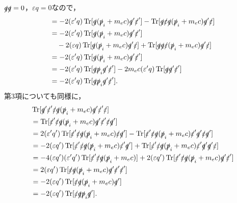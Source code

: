 $\slashed{q}\slashed{q}=0$，$\varepsilon q=0$なので，
\begin{align*}
  & = -2(\varepsilon'q)\operatorname{Tr} [\slashed{q}(\slashed{p}_i+m_ec)\slashed{q}'\slashed{\varepsilon}'] - \operatorname{Tr} [\slashed{q}\slashed{\varepsilon}\slashed{q}(\slashed{p}_i+m_ec)\slashed{q}'\slashed{\varepsilon}]\\
  & = -2(\varepsilon'q)\operatorname{Tr} [\slashed{q}(\slashed{p}_i+m_ec)\slashed{q}'\slashed{\varepsilon}'] \\
  & \quad -2(\varepsilon q)\operatorname{Tr} [\slashed{q}(\slashed{p}_i+m_ec)\slashed{q}'\slashed{\varepsilon}] + \operatorname{Tr} [\slashed{q}\slashed{q}\slashed{\varepsilon}(\slashed{p}_i+m_ec)\slashed{q}'\slashed{\varepsilon}]\\
  & = -2(\varepsilon'q)\operatorname{Tr} [\slashed{q}(\slashed{p}_i+m_ec)\slashed{q}'\slashed{\varepsilon}']\\
  & = -2(\varepsilon'q)\operatorname{Tr} [\slashed{q}\slashed{p}_i\slashed{q}'\slashed{\varepsilon}'] - 2m_ec(\varepsilon'q)\operatorname{Tr} [\slashed{q}\slashed{q}'\slashed{\varepsilon}']\\
  & = -2(\varepsilon'q)\operatorname{Tr} [\slashed{q}\slashed{p}_i\slashed{q}'\slashed{\varepsilon}'].
\end{align*}
第3項についても同様に，
\begin{align*}
  & \operatorname{Tr} [\slashed{q}'\slashed{\varepsilon}'\slashed{\varepsilon}\slashed{q}(\slashed{p}_i+m_ec)\slashed{q}'\slashed{\varepsilon}'\slashed{\varepsilon}]\\
  & = \operatorname{Tr} [\slashed{\varepsilon}'\slashed{\varepsilon}\slashed{q}(\slashed{p}_i+m_ec)\slashed{q}'\slashed{\varepsilon}'\slashed{\varepsilon}\slashed{q}']\\
  & = 2(\varepsilon'q')\operatorname{Tr} [\slashed{\varepsilon}'\slashed{\varepsilon}\slashed{q}(\slashed{p}_i+m_ec)\slashed{\varepsilon}\slashed{q}'] - \operatorname{Tr} [\slashed{\varepsilon}'\slashed{\varepsilon}\slashed{q}(\slashed{p}_i+m_ec)\slashed{\varepsilon}'\slashed{q}'\slashed{\varepsilon}\slashed{q}']\\
  & = -2(\varepsilon q')\operatorname{Tr} [\slashed{\varepsilon}'\slashed{\varepsilon}\slashed{q}(\slashed{p}_i+m_ec)\slashed{\varepsilon}'\slashed{q}'] + \operatorname{Tr} [\slashed{\varepsilon}'\slashed{\varepsilon}\slashed{q}(\slashed{p}_i+m_ec)\slashed{\varepsilon}'\slashed{q}'\slashed{q}'\slashed{\varepsilon}]\\
  & = -4(\varepsilon q')(\varepsilon'q')\operatorname{Tr} [\slashed{\varepsilon}'\slashed{\varepsilon}\slashed{q}(\slashed{p}_i+m_ec)] + 2(\varepsilon q')\operatorname{Tr} [\slashed{\varepsilon}'\slashed{\varepsilon}\slashed{q}(\slashed{p}_i+m_ec)\slashed{q}'\slashed{\varepsilon}']\\
  & = 2(\varepsilon q')\operatorname{Tr} [\slashed{\varepsilon}\slashed{q}(\slashed{p}_i+m_ec)\slashed{q}'\slashed{\varepsilon}'\slashed{\varepsilon}']\\
  & = -2(\varepsilon q')\operatorname{Tr} [\slashed{\varepsilon}\slashed{q}(\slashed{p}_i+m_ec)\slashed{q}']\\
  & = -2(\varepsilon q')\operatorname{Tr} [\slashed{\varepsilon}\slashed{q}\slashed{p}_i\slashed{q}'].
\end{align*}
